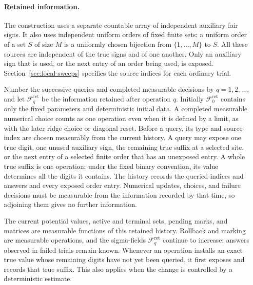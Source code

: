 \paragraph{Retained information.}
The construction uses a separate countable array of independent auxiliary
fair signs. It also uses independent uniform orders of fixed finite
sets: a uniform order of a set $S$ of size $M$ is a uniformly chosen
bijection from $\{1,\ldots,M\}$ to $S$. All these sources are independent
of the true signs and of one another. Only an auxiliary sign that is used,
or the next entry of an order being used, is exposed. Section~\ref{sec:local-sweeps}
specifies the source indices for each ordinary trial.

Number the successive queries and completed measurable decisions by
$q=1,2,\ldots$, and let
$\mathcal F_q^{\mathrm{ret}}$ be the information retained after operation $q$.
Initially $\mathcal F_0^{\mathrm{ret}}$ contains only the fixed parameters and deterministic
initial data. A completed measurable numerical choice counts as one
operation even when it is defined by a limit, as with the later ridge choice
or diagonal reset. Before a query, its type and source index are chosen
measurably from the current history. A query may expose one true digit,
one unused auxiliary sign, the remaining true suffix at a selected site,
or the next entry of a selected finite order that has an unexposed entry.
A whole true suffix is one
operation; under the fixed binary convention, its value determines all
the digits it contains. The history records the queried indices and
answers and every exposed order entry. Numerical updates, choices, and
failure decisions must be measurable from the information recorded by
that time, so adjoining them gives no further information.

The current potential values, active and terminal sets, pending marks, and
matrices are measurable functions of this retained history. Rollback and
marking are measurable operations, and the sigma-fields $\mathcal F_q^{\mathrm{ret}}$
continue to increase: answers observed in failed trials remain known.
Whenever an
operation installs an exact true value whose remaining digits have not
yet been queried, it first exposes and records that true suffix. This
also applies when the change is controlled by a deterministic estimate.

